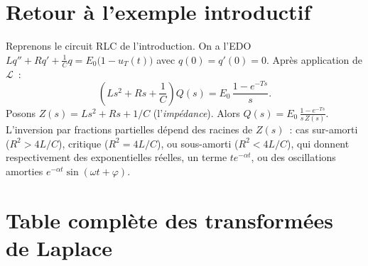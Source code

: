 \documentclass[12pt,a4paper,openany]{book}
\theoremstyle{definition}
\theoremstyle{plain}
\theoremstyle{remark}
\begin{document}
\section{Retour à l'exemple introductif}\label{sec:retour-circuit}

Reprenons le circuit RLC de l'introduction. On a l'EDO
$Lq''+Rq'+\frac{1}{C}q = E_0\bigl(1-u_T(t)\bigr)$ avec
$q(0)=q'(0)=0$. Après application de $\mathcal{L}$~:
\[
  \left(Ls^2+Rs+\frac{1}{C}\right)Q(s)
  = E_0\,\frac{1-e^{-Ts}}{s}.
\]
Posons $Z(s)=Ls^2+Rs+1/C$ (l'\emph{impédance}).
Alors $Q(s)=E_0\,\frac{1-e^{-Ts}}{s\,Z(s)}$. L'inversion par
fractions partielles dépend des racines de $Z(s)$~: cas
sur-amorti ($R^2>4L/C$), critique ($R^2=4L/C$), ou
sous-amorti ($R^2<4L/C$), qui donnent respectivement des
exponentielles réelles, un terme $te^{-\alpha t}$, ou des
oscillations amorties $e^{-\alpha t}\sin(\omega t+\varphi)$.

\section{Table complète des transformées de Laplace}\label{sec:table-complete}
\end{document}
